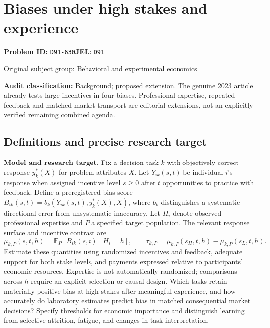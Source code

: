 \documentclass[11pt,a4paper]{article}
\begin{document}
\section*{Biases under high stakes and experience}
\textbf{Problem ID:} \texttt{D91-630}\quad \textbf{JEL:} \texttt{D91}\par
\label{problem:OP-0302}
{\sffamily\small\color{muted}Original subject group: Behavioral and experimental economics\par}
\label{definitions:problem:30007584}
\textbf{Audit classification:} Background; proposed extension. The genuine 2023 article already tests large incentives in four biases. Professional expertise, repeated feedback and matched market transport are editorial extensions, not an explicitly verified remaining combined agenda.
\subsection*{Definitions and precise research target}
\textbf{Model and research target.} Fix a decision task \(k\) with objectively correct response \(y_k^*(X)\) for problem attributes \(X\). Let \(Y_{ik}(s,t)\) be individual \(i\)'s response when assigned incentive level \(s\geq0\) after \(t\) opportunities to practice with feedback. Define a preregistered bias score \(B_{ik}(s,t)=b_k(Y_{ik}(s,t),y_k^*(X),X)\), where \(b_k\) distinguishes a systematic directional error from unsystematic inaccuracy. Let \(H_i\) denote observed professional expertise and \(P\) a specified target population. The relevant response surface and incentive contrast are
\[\mu_{k,P}(s,t,h)=\mathbb E_P[B_{ik}(s,t)\mid H_i=h],\qquad \tau_{k,P}=\mu_{k,P}(s_H,t,h)-\mu_{k,P}(s_L,t,h).\]
Estimate these quantities using randomized incentives and feedback, adequate support for both stake levels, and payments expressed relative to participants' economic resources. Expertise is not automatically randomized; comparisons across \(h\) require an explicit selection or causal design. Which tasks retain materially positive bias at high stakes after meaningful experience, and how accurately do laboratory estimates predict bias in matched consequential market decisions? Specify thresholds for economic importance and distinguish learning from selective attrition, fatigue, and changes in task interpretation.
\end{document}
